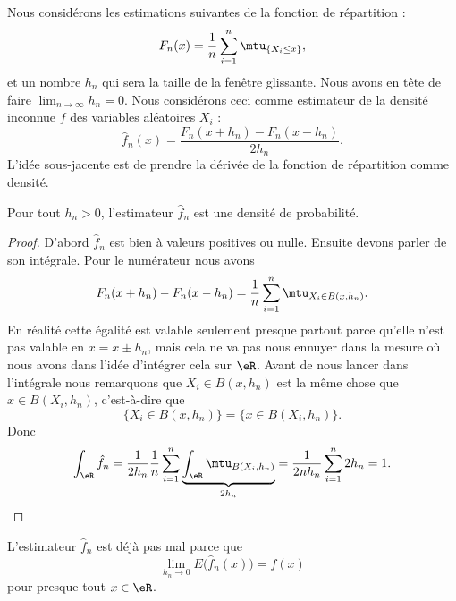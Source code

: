 Nous considérons les estimations suivantes de la fonction de répartition :
\begin{equation}
	F_n(x)=\frac{1}{ n }\sum_{i=1}^n\mtu_{\{ X_i\leq x \}},
\end{equation}
et un nombre \( h_n\) qui sera la taille de la fenêtre glissante. Nous avons en tête de faire \( \lim_{n\to \infty} h_n=0\). Nous considérons ceci comme estimateur de la densité inconnue \( f\) des variables aléatoires \( X_i\) :
\begin{equation}
	\hat f_n(x)=\frac{ F_n(x+h_n)-F_n(x-h_n) }{ 2h_n }.
\end{equation}
L'idée sous-jacente est de prendre la dérivée de la fonction de répartition comme densité.

\begin{lemma}
	Pour tout \( h_n>0\), l'estimateur \( \hat f_n\) est une densité de probabilité.
\end{lemma}

\begin{proof}
	D'abord \( \hat f_n\) est bien à valeurs positives ou nulle. Ensuite devons parler de son intégrale. Pour le numérateur nous avons
	\begin{equation}
		F_n(x+h_n)-F_n(x-h_n)=\frac{1}{ n }\sum_{i=1}^{n}\mtu_{X_i\in B(x,h_n)}.
	\end{equation}
	En réalité cette égalité est valable seulement presque partout parce qu'elle n'est pas valable en \( x=x\pm h_n\), mais cela ne va pas nous ennuyer dans la mesure où nous avons dans l'idée d'intégrer cela sur \( \eR\). Avant de nous lancer dans l'intégrale nous remarquons que \( X_i\in B(x,h_n)\) est la même chose que \( x\in B(X_i,h_n)\), c'est-à-dire que
	\begin{equation}
		\{ X_i\in B(x,h_n) \}=\{ x\in B(X_i,h_n) \}.
	\end{equation}
	Donc
	\begin{equation}
		\int_{\eR}\hat f_n=\frac{1}{ 2h_n }\frac{1}{ n }\sum_{i=1}^n\underbrace{\int_{\eR}\mtu_{B(X_i,h_n)}}_{2h_n}=\frac{1}{ 2nh_n }\sum_{i=1}^n2h_n=1.
	\end{equation}
\end{proof}

\begin{lemma}   \label{LemTZopXDd}
	L'estimateur \( \hat f_n\) est déjà pas mal parce que
	\begin{equation}
		\lim_{h_n\to 0} E\big( \hat f_n(x) \big)= f(x)
	\end{equation}
	pour presque tout \( x\in \eR\).
\end{lemma}

